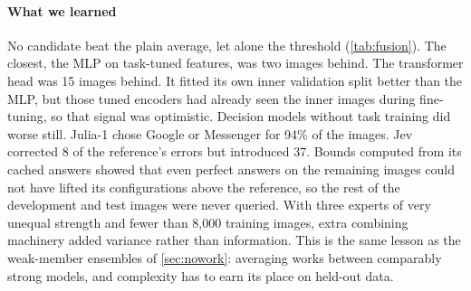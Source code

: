 \paragraph{What we learned} No candidate beat the plain average, let alone the threshold (\cref{tab:fusion}). The closest, the MLP on task-tuned features, was two images behind. The transformer head was 15 images behind. It fitted its own inner validation split better than the MLP, but those tuned encoders had already seen the inner images during fine-tuning, so that signal was optimistic. Decision models without task training did worse still. Julia-1 chose Google or Messenger for 94\% of the images. Jev corrected 8 of the reference's errors but introduced 37. Bounds computed from its cached answers showed that even perfect answers on the remaining images could not have lifted its configurations above the reference, so the rest of the development and test images were never queried. With three experts of very unequal strength and fewer than 8{,}000 training images, extra combining machinery added variance rather than information. This is the same lesson as the weak-member ensembles of \cref{sec:nowork}: averaging works between comparably strong models, and complexity has to earn its place on held-out data.

